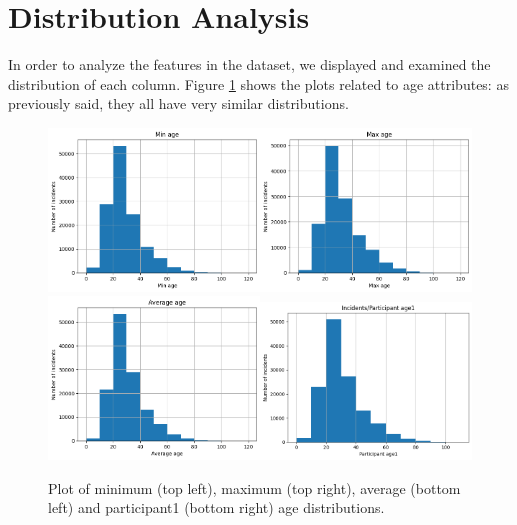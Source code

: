 \documentclass[10pt,a4paper]{report}
\begin{document}
\section{Distribution Analysis}

In order to analyze the features in the dataset, we displayed and examined the distribution of each column.
Figure \ref{age_du} shows the plots related to age attributes: as previously said, they all have very similar distributions.

\begin{figure}[h]
	\centering
	\includegraphics[width=0.5\textwidth]{min_age_du}\includegraphics[width=0.5\textwidth]{max_age_du}
	\includegraphics[width=0.5\textwidth]{avg_age_du}\includegraphics[width=0.5\textwidth]{part_age_du}
	\caption{Plot of minimum (top left), maximum (top right), average (bottom left) and participant1 (bottom right) age distributions.}
	\label{age_du}
\end{figure}
\end{document}
